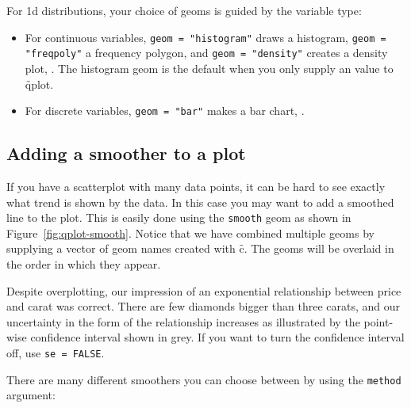 \noindent For 1d distributions, your choice of geoms is guided by the variable type:

\begin{itemize}
  \item For continuous variables, {\tt geom = "histogram"} draws a histogram, {\tt geom = "freqpoly"} a frequency polygon, and {\tt geom = "density"} creates a density plot, .  The histogram geom is the default when you only supply an  value to \f{qplot}.

  \item For discrete variables, {\tt geom = "bar"} makes a bar chart, .

\end{itemize}


\subsection{Adding a smoother to a plot}\label{sub:smooth}

If you have a scatterplot with many data points, it can be hard to see exactly what trend is shown by the data. In this case you may want to add a smoothed line to the plot. This is easily done using the {\tt smooth} geom as shown in Figure~\ref{fig:qplot-smooth}. Notice that we have combined multiple geoms by supplying a vector of geom names created with \f{c}.  The geoms will be overlaid in the order in which they appear.   

% 


Despite overplotting, our impression of an exponential relationship between price and carat was correct. There are few diamonds bigger than three carats, and our uncertainty in the form of the relationship increases as illustrated by the point-wise confidence interval shown in grey. If you want to turn the confidence interval off, use {\tt se = FALSE}. 

There are many different smoothers you can choose between by using the {\tt method} argument:

